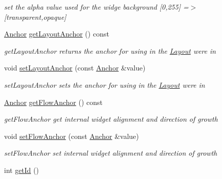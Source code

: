 \begin{DoxyCompactItemize}
\begin{DoxyCompactList}\small\item\em set the alpha value used for the widge background \mbox{[}0,255\mbox{]} =$>$ \mbox{[}transparent,opaque\mbox{]} \end{DoxyCompactList}\item 
\hyperlink{classcanvascv_1_1Widget_a98ca3c300ba50b316fa5a1d300456abe}{Anchor} \hyperlink{classcanvascv_1_1Widget_a3b460d40be2a634153bf0785c46383b9}{get\+Layout\+Anchor} () const 
\begin{DoxyCompactList}\small\item\em get\+Layout\+Anchor returns the anchor for using in the \hyperlink{classcanvascv_1_1Layout}{Layout} we\textquotesingle{}re in \end{DoxyCompactList}\item 
void \hyperlink{classcanvascv_1_1Widget_a7180ca0054874c853e805e7842741596}{set\+Layout\+Anchor} (const \hyperlink{classcanvascv_1_1Widget_a98ca3c300ba50b316fa5a1d300456abe}{Anchor} \&value)
\begin{DoxyCompactList}\small\item\em set\+Layout\+Anchor sets the anchor for using in the \hyperlink{classcanvascv_1_1Layout}{Layout} we\textquotesingle{}re in \end{DoxyCompactList}\item 
\hyperlink{classcanvascv_1_1Widget_a98ca3c300ba50b316fa5a1d300456abe}{Anchor} \hyperlink{classcanvascv_1_1Widget_a4956e8b0ced615c3177dc38f553732fb}{get\+Flow\+Anchor} () const 
\begin{DoxyCompactList}\small\item\em get\+Flow\+Anchor get internal widget alignment and direction of growth \end{DoxyCompactList}\item 
void \hyperlink{classcanvascv_1_1Widget_a69f455f7fbf67f636ee1155795057b87}{set\+Flow\+Anchor} (const \hyperlink{classcanvascv_1_1Widget_a98ca3c300ba50b316fa5a1d300456abe}{Anchor} \&value)
\begin{DoxyCompactList}\small\item\em set\+Flow\+Anchor set internal widget alignment and direction of growth \end{DoxyCompactList}\item 
int \hyperlink{classcanvascv_1_1Widget_af68aa024314497681d3f1cac1c511d53}{get\+Id} ()\hypertarget{classcanvascv_1_1Widget_af68aa024314497681d3f1cac1c511d53}{}\label{classcanvascv_1_1Widget_af68aa024314497681d3f1cac1c511d53}


\end{DoxyCompactItemize}
